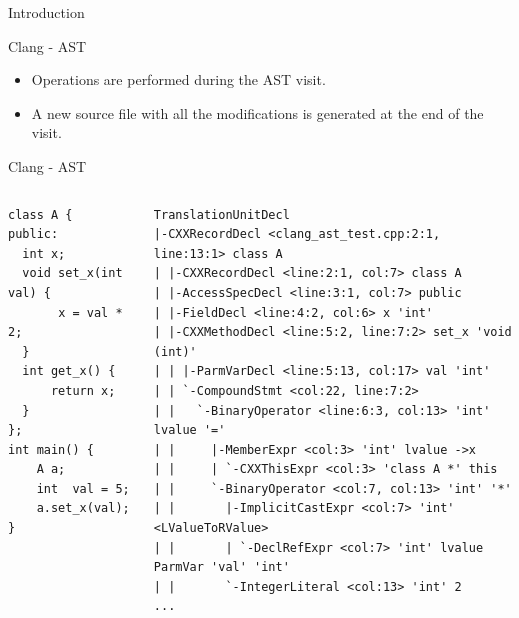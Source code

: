 \documentclass[xcolor=dvipsnames]{beamer}
\begin{document}
\begin{section}{Introduction}
\begin{frame}{\hskip 0.3cm Clang - AST}
\begin{itemize}
\item Operations are performed during the AST visit.

\item A new source file with all the modifications is generated at the end of the visit.

\end{itemize}

\end{frame}














\begin{frame}[fragile]{\hskip 0.3cm Clang - AST}

\begin{columns}

\begin{column}{4cm}
\begin{lstlisting}[language=CCC]
class A {
public:
  int x;
  void set_x(int val) {
       x = val * 2;
  }	
  int get_x() {
      return x;
  }
};
int main() {
    A a;
    int  val = 5;
    a.set_x(val);
}
\end{lstlisting}
\end{column}

\begin{column}{7.3cm}

\begin{lstlisting}[language=AST]
TranslationUnitDecl
|-CXXRecordDecl <clang_ast_test.cpp:2:1, line:13:1> class A
| |-CXXRecordDecl <line:2:1, col:7> class A
| |-AccessSpecDecl <line:3:1, col:7> public
| |-FieldDecl <line:4:2, col:6> x 'int'
| |-CXXMethodDecl <line:5:2, line:7:2> set_x 'void (int)'
| | |-ParmVarDecl <line:5:13, col:17> val 'int'
| | `-CompoundStmt <col:22, line:7:2>
| |   `-BinaryOperator <line:6:3, col:13> 'int' lvalue '='
| |     |-MemberExpr <col:3> 'int' lvalue ->x
| |     | `-CXXThisExpr <col:3> 'class A *' this
| |     `-BinaryOperator <col:7, col:13> 'int' '*'
| |       |-ImplicitCastExpr <col:7> 'int' <LValueToRValue>
| |       | `-DeclRefExpr <col:7> 'int' lvalue ParmVar 'val' 'int'
| |       `-IntegerLiteral <col:13> 'int' 2
...
\end{lstlisting}
\end{column}

\end{columns}


\end{frame}








\end{section}
\end{document}
